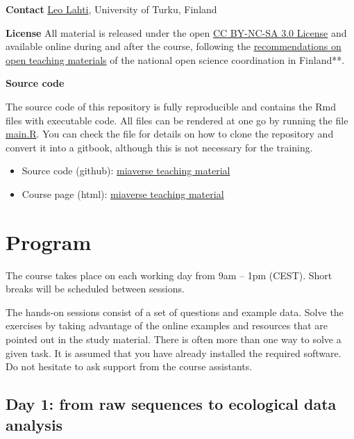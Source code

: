 \documentclass[
  oneside]{book}
\providecommand{\tightlist}{%
  \setlength{\itemsep}{0pt}\setlength{\parskip}{0pt}}
\begin{document}
\textbf{Contact} \href{http://datascience.utu.fi}{Leo Lahti}, University of Turku, Finland

\textbf{License} All material is released under the open \href{LICENSE}{CC BY-NC-SA 3.0 License} and available online during and after the course, following the
\href{https://avointiede.fi/fi/linjaukset-ja-aineistot/kotimaiset-linjaukset/oppimisen-ja-oppimateriaalien-avoimuuden-linjaus}{recommendations on open teaching materials} of the national open science coordination in Finland**.

\textbf{Source code}

The source code of this repository is fully reproducible and contains
the Rmd files with executable code. All files can be rendered at one
go by running the file \url{main.R}. You can check the file for
details on how to clone the repository and convert it into a gitbook,
although this is not necessary for the training.

\begin{itemize}
\tightlist
\item
  Source code (github): \href{https://github.com/microbiome/course_2022_oulu}{miaverse teaching material}
\item
  Course page (html): \href{https://microbiome.github.io/course_2022_oulu/}{miaverse teaching material}
\end{itemize}

\hypertarget{program}{%
\chapter{Program}\label{program}}

The course takes place on each working day from 9am -- 1pm
(CEST). Short breaks will be scheduled between sessions.

The hands-on sessions consist of a set of questions and example
data. Solve the exercises by taking advantage of the online examples
and resources that are pointed out in the study material. There is
often more than one way to solve a given task. It is assumed that you
have already installed the required software. Do not hesitate to ask
support from the course assistants.

\hypertarget{day-1-from-raw-sequences-to-ecological-data-analysis}{%
\section{Day 1: from raw sequences to ecological data analysis}\label{day-1-from-raw-sequences-to-ecological-data-analysis}}
\end{document}
